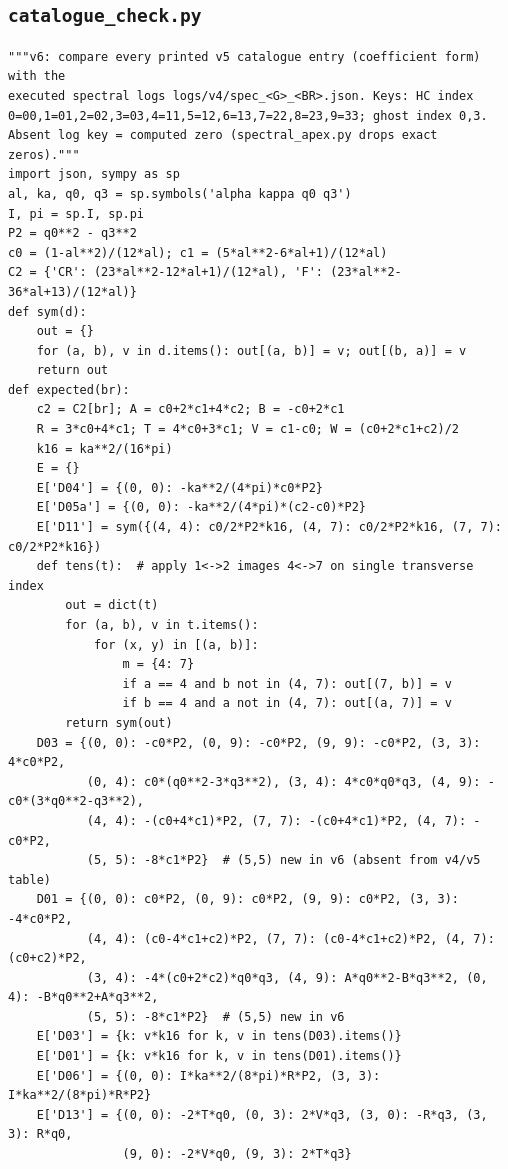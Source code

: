 \documentclass[10pt]{article}
\begin{document}
\subsection{\texttt{catalogue\_check.py}}
\begin{lstlisting}
"""v6: compare every printed v5 catalogue entry (coefficient form) with the
executed spectral logs logs/v4/spec_<G>_<BR>.json. Keys: HC index
0=00,1=01,2=02,3=03,4=11,5=12,6=13,7=22,8=23,9=33; ghost index 0,3.
Absent log key = computed zero (spectral_apex.py drops exact zeros)."""
import json, sympy as sp
al, ka, q0, q3 = sp.symbols('alpha kappa q0 q3')
I, pi = sp.I, sp.pi
P2 = q0**2 - q3**2
c0 = (1-al**2)/(12*al); c1 = (5*al**2-6*al+1)/(12*al)
C2 = {'CR': (23*al**2-12*al+1)/(12*al), 'F': (23*al**2-36*al+13)/(12*al)}
def sym(d):
    out = {}
    for (a, b), v in d.items(): out[(a, b)] = v; out[(b, a)] = v
    return out
def expected(br):
    c2 = C2[br]; A = c0+2*c1+4*c2; B = -c0+2*c1
    R = 3*c0+4*c1; T = 4*c0+3*c1; V = c1-c0; W = (c0+2*c1+c2)/2
    k16 = ka**2/(16*pi)
    E = {}
    E['D04'] = {(0, 0): -ka**2/(4*pi)*c0*P2}
    E['D05a'] = {(0, 0): -ka**2/(4*pi)*(c2-c0)*P2}
    E['D11'] = sym({(4, 4): c0/2*P2*k16, (4, 7): c0/2*P2*k16, (7, 7): c0/2*P2*k16})
    def tens(t):  # apply 1<->2 images 4<->7 on single transverse index
        out = dict(t)
        for (a, b), v in t.items():
            for (x, y) in [(a, b)]:
                m = {4: 7}
                if a == 4 and b not in (4, 7): out[(7, b)] = v
                if b == 4 and a not in (4, 7): out[(a, 7)] = v
        return sym(out)
    D03 = {(0, 0): -c0*P2, (0, 9): -c0*P2, (9, 9): -c0*P2, (3, 3): 4*c0*P2,
           (0, 4): c0*(q0**2-3*q3**2), (3, 4): 4*c0*q0*q3, (4, 9): -c0*(3*q0**2-q3**2),
           (4, 4): -(c0+4*c1)*P2, (7, 7): -(c0+4*c1)*P2, (4, 7): -c0*P2,
           (5, 5): -8*c1*P2}  # (5,5) new in v6 (absent from v4/v5 table)
    D01 = {(0, 0): c0*P2, (0, 9): c0*P2, (9, 9): c0*P2, (3, 3): -4*c0*P2,
           (4, 4): (c0-4*c1+c2)*P2, (7, 7): (c0-4*c1+c2)*P2, (4, 7): (c0+c2)*P2,
           (3, 4): -4*(c0+2*c2)*q0*q3, (4, 9): A*q0**2-B*q3**2, (0, 4): -B*q0**2+A*q3**2,
           (5, 5): -8*c1*P2}  # (5,5) new in v6
    E['D03'] = {k: v*k16 for k, v in tens(D03).items()}
    E['D01'] = {k: v*k16 for k, v in tens(D01).items()}
    E['D06'] = {(0, 0): I*ka**2/(8*pi)*R*P2, (3, 3): I*ka**2/(8*pi)*R*P2}
    E['D13'] = {(0, 0): -2*T*q0, (0, 3): 2*V*q3, (3, 0): -R*q3, (3, 3): R*q0,
                (9, 0): -2*V*q0, (9, 3): 2*T*q3}

\end{lstlisting}
\end{document}
